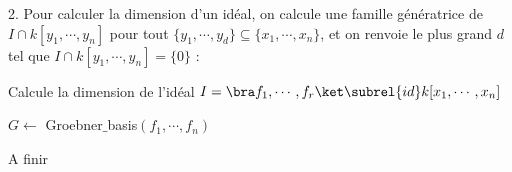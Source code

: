 \documentclass[11pt]{article}
\newcommand{\cor}[1]{{\color{red} #1}}
\begin{document}
    \begin{question}{2.}
        Pour calculer la dimension d'un idéal, on calcule une famille génératrice de $I \cap k[y_1, \cdots, y_n]$ pour tout $\{y_1, \cdots, y_d\} \subseteq \{x_1, \cdots, x_n\}$, et on renvoie le plus grand $d$ tel que $I \cap k[y_1, \cdots, y_n] = \{0\}$ :
        \begin{algorithm}
            \caption{Calcule la dimension de l'idéal $I = \bra f_1, \cdots, f_r \ket \subrel{id} k[x_1, \cdots, x_n]$}
            \begin{algorithmic}
                    \State $G \gets$ Groebner$\_$basis$(f_1, \cdots, f_n)$
                    \EndFor
                \EndFunction
            \end{algorithmic}
        \end{algorithm}
        \cor{A finir}
    \end{question}
\end{document}
